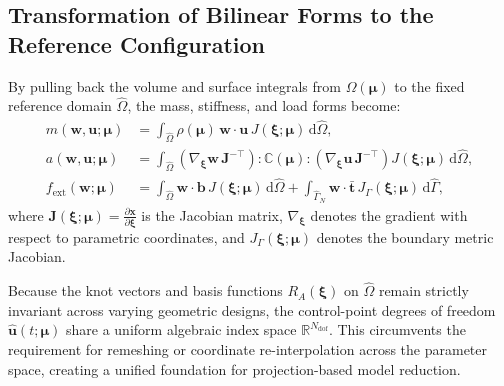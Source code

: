 \subsection{Transformation of Bilinear Forms to the Reference Configuration}
\label{subsec:ref_transformation}
By pulling back the volume and surface integrals from $\Omega(\bm{\mu})$ to the fixed reference domain $\hat{\Omega}$, the mass, stiffness, and load forms become:
\begin{align}
    m(\bm{w}, \bm{u}; \bm{\mu}) &= \int_{\hat{\Omega}} \rho(\bm{\mu}) \, \bm{w} \cdot \bm{u} \, J(\bm{\xi}; \bm{\mu}) \, \mathrm{d}\hat{\Omega}, \\
    a(\bm{w}, \bm{u}; \bm{\mu}) &= \int_{\hat{\Omega}} \left( \nabla_{\bm{\xi}} \bm{w} \, \bm{J}^{-\top} \right) : \mathbb{C}(\bm{\mu}) : \left( \nabla_{\bm{\xi}} \bm{u} \, \bm{J}^{-\top} \right) J(\bm{\xi}; \bm{\mu}) \, \mathrm{d}\hat{\Omega}, \\
    f_{\text{ext}}(\bm{w}; \bm{\mu}) &= \int_{\hat{\Omega}} \bm{w} \cdot \bm{b} \, J(\bm{\xi}; \bm{\mu}) \, \mathrm{d}\hat{\Omega} + \int_{\hat{\Gamma}_N} \bm{w} \cdot \bar{\bm{t}} \, J_{\Gamma}(\bm{\xi}; \bm{\mu}) \, \mathrm{d}\hat{\Gamma},
\end{align}
where $\bm{J}(\bm{\xi}; \bm{\mu}) = \frac{\partial \bm{x}}{\partial \bm{\xi}}$ is the Jacobian matrix, $\nabla_{\bm{\xi}}$ denotes the gradient with respect to parametric coordinates, and $J_{\Gamma}(\bm{\xi}; \bm{\mu})$ denotes the boundary metric Jacobian.

Because the knot vectors and basis functions $R_A(\bm{\xi})$ on $\hat{\Omega}$ remain strictly invariant across varying geometric designs, the control-point degrees of freedom $\hat{\bm{u}}(t; \bm{\mu})$ share a uniform algebraic index space $\mathbb{R}^{N_{\text{dof}}}$. This circumvents the requirement for remeshing or coordinate re-interpolation across the parameter space, creating a unified foundation for projection-based model reduction.
